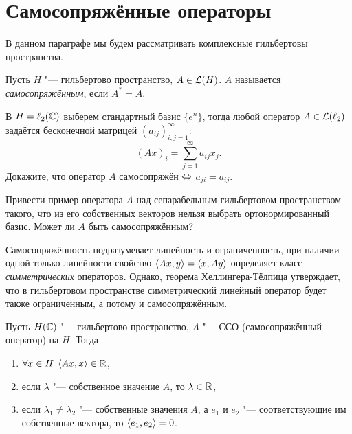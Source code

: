 \documentclass[main]{subfiles}
\begin{document}
\section{Самосопряжённые операторы}%

В данном параграфе мы будем рассматривать
комплексные гильбертовы пространства.

\begin{definition}
  Пусть $H$ "--- гильбертово пространство,
  $A \in \Linears{H}$. $A$ называется
  \emph{самосопряжённым}, если $A^* = A$.
\end{definition}

\begin{exercise}
  В \( H = \ell_2(\mathbb{C}) \)
  выберем стандартный базис \( \{ e^n \} \),
  тогда любой оператор \( A \in \Linears{\ell_2} \)
  задаётся бесконечной матрицей
  \( (a_{ij})_{i,j=1}^{\infty} \):
  \[
    (Ax)_i = \sum_{j=1}^\infty a_{ij} x_j.
  \]
  Докажите, что
  оператор \( A \) самосопряжён \( \Leftrightarrow \)
  \( a_{ji} = \overline{a_{ij}} \).
\end{exercise}

\begin{exercise}
  Привести пример оператора \( A \)
  над сепарабельным гильбертовом пространством такого,
  что из его собственных векторов нельзя выбрать
  ортонормированный базис.
  Может ли \( A \) быть самосопряжённым?
\end{exercise}

\begin{remark}
  Самосопряжённость подразумевает линейность и ограниченность,
  при наличии одной только линейности
  свойство $\langle Ax, y \rangle = \langle x, Ay \rangle$ определяет класс
  \emph{симметрических} операторов.
  Однако, теорема Хеллингера-Тёлпица утверждает,
  что в гильбертовом пространстве
  симметрический линейный оператор будет также ограниченным,
  а потому и самосопряжённым.
\end{remark}

\begin{theorem}%
  Пусть \( H(\mathbb{C}) \) "--- гильбертово пространство,
  \( A \) "--- ССО
  (самосопряжённый оператор) на \( H \). Тогда
  \begin{enumerate}
    \item \( \forall {x \in H} \; \, \langle Ax, x \rangle \in \mathbb{R} \),
    \item если \( \lambda \) "--- собственное значение \( A \),
      то \( \lambda \in \mathbb{R} \),
    \item если \( \lambda_1 \ne \lambda_2 \) "---
      собственные значения \( A \),
      а \( e_1 \) и \( e_2 \) "--- соответствующие им
      собственные вектора, то \( \langle e_1, e_2 \rangle = 0 \).
  \end{enumerate}
\end{theorem}
\end{document}
